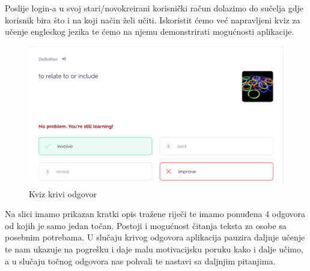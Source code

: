 Poslije login-a u svoj stari/novokreirani korisnički račun dolazimo do sučelja gdje korisnik bira što i na koji način želi učiti. Iskoristit ćemo već napravljeni kviz za učenje engleskog jezika te ćemo na njemu demonstrirati mogućnosti aplikacije. 

\begin{figure}[H]
	\includegraphics[width=\textwidth]{SlikeOpisProjekta/english_quiz_wrong_answer_quizlet.png} %
	\caption{Kviz krivi odgovor}
	\label{fig:EnglishQuizWrongAnswerQuizlet} %
\end{figure}

Na slici imamo prikazan kratki opis tražene riječi te imamo ponuđena 4 odgovora od kojih je samo jedan točan. Postoji i mogućnost čitanja teksta za osobe sa posebnim potrebama.
U slučaju krivog odgovora aplikacija pauzira daljnje učenje te nam ukazuje na pogrešku i daje malu motivacijsku poruku kako i dalje učimo, a u slučaju točnog odgovora nas pohvali te nastavi sa daljnjim pitanjima.

		\eject
		